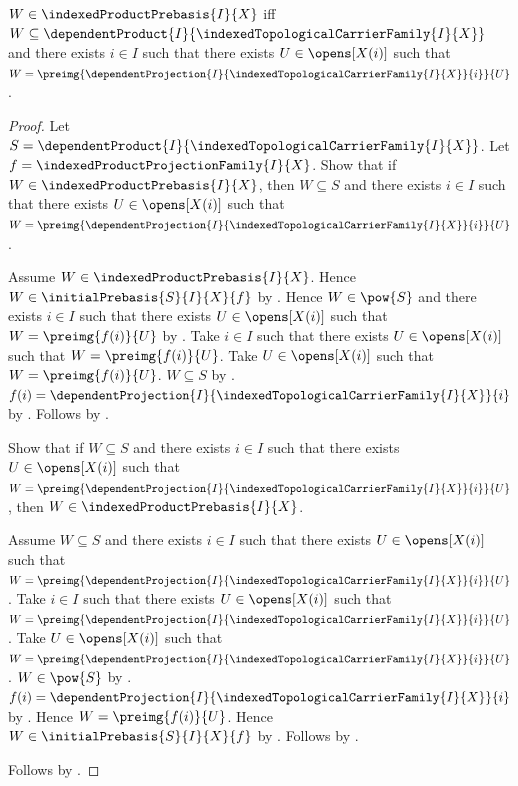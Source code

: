 \begin{proposition}\label{indexed_product_prebasis_iff}
    $W\in\indexedProductPrebasis{I}{X}$ iff
        $W\subseteq\dependentProduct{I}{
            \indexedTopologicalCarrierFamily{I}{X}}$ and
        there exists $i\in I$ such that there exists $U\in\opens[X(i)]$
            such that
            $W=\preimg{
                \dependentProjection{I}{
                    \indexedTopologicalCarrierFamily{I}{X}}{i}}{U}$.
\end{proposition}
\begin{proof}
    Let $S=\dependentProduct{I}{
        \indexedTopologicalCarrierFamily{I}{X}}$.
    Let $f=\indexedProductProjectionFamily{I}{X}$.
    Show that if $W\in\indexedProductPrebasis{I}{X}$, then
        $W\subseteq S$ and there exists $i\in I$ such that
        there exists $U\in\opens[X(i)]$ such that
        $W=\preimg{\dependentProjection{I}{
            \indexedTopologicalCarrierFamily{I}{X}}{i}}{U}$.
    \begin{subproof}
        Assume $W\in\indexedProductPrebasis{I}{X}$.
        Hence $W\in\initialPrebasis{S}{I}{X}{f}$ by
            .
        Hence $W\in\pow{S}$ and there exists $i\in I$ such that
            there exists $U\in\opens[X(i)]$ such that
                $W=\preimg{f(i)}{U}$ by .
        Take $i\in I$ such that there exists $U\in\opens[X(i)]$
            such that $W=\preimg{f(i)}{U}$.
        Take $U\in\opens[X(i)]$ such that $W=\preimg{f(i)}{U}$.
        $W\subseteq S$ by .
        $f(i)=\dependentProjection{I}{
            \indexedTopologicalCarrierFamily{I}{X}}{i}$ by
            .
        Follows by \auto.
    \end{subproof}

    Show that if $W\subseteq S$ and there exists $i\in I$ such that
        there exists $U\in\opens[X(i)]$ such that
        $W=\preimg{\dependentProjection{I}{
            \indexedTopologicalCarrierFamily{I}{X}}{i}}{U}$,
        then $W\in\indexedProductPrebasis{I}{X}$.
    \begin{subproof}
        Assume $W\subseteq S$ and there exists $i\in I$ such that
            there exists $U\in\opens[X(i)]$ such that
            $W=\preimg{\dependentProjection{I}{
                \indexedTopologicalCarrierFamily{I}{X}}{i}}{U}$.
        Take $i\in I$ such that there exists $U\in\opens[X(i)]$
            such that $W=\preimg{\dependentProjection{I}{
                \indexedTopologicalCarrierFamily{I}{X}}{i}}{U}$.
        Take $U\in\opens[X(i)]$ such that
            $W=\preimg{\dependentProjection{I}{
                \indexedTopologicalCarrierFamily{I}{X}}{i}}{U}$.
        $W\in\pow{S}$ by .
        $f(i)=\dependentProjection{I}{
            \indexedTopologicalCarrierFamily{I}{X}}{i}$ by
            .
        Hence $W=\preimg{f(i)}{U}$.
        Hence $W\in\initialPrebasis{S}{I}{X}{f}$ by
            .
        Follows by .
    \end{subproof}
    Follows by \auto.
\end{proof}

